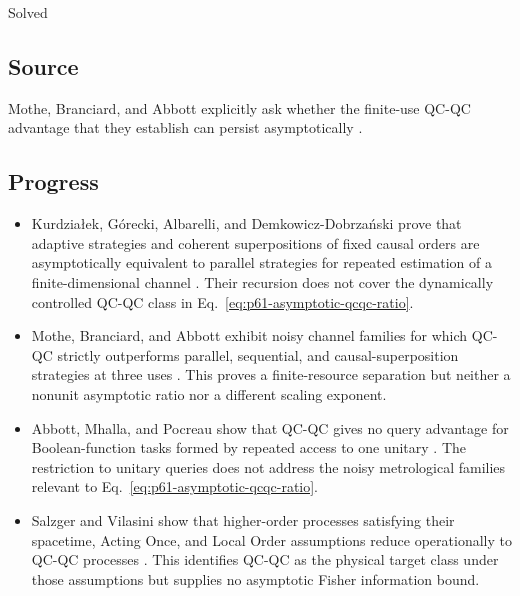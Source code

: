 Solved

\subsection*{Source}

Mothe, Branciard, and Abbott explicitly ask whether the finite-use QC-QC
advantage that they establish can persist asymptotically
.

\subsection*{Progress}

\begin{itemize}
  \item Kurdzia\l ek, G\'orecki, Albarelli, and Demkowicz-Dobrza\'nski prove
  that adaptive strategies and coherent superpositions of fixed causal
  orders are asymptotically equivalent to parallel strategies for repeated
  estimation of a finite-dimensional channel
  .  Their recursion does not cover
  the dynamically controlled QC-QC class in
  Eq.~\eqref{eq:p61-asymptotic-qcqc-ratio}.

  \item Mothe, Branciard, and Abbott exhibit noisy channel families for which
  QC-QC strictly outperforms parallel, sequential, and causal-superposition
  strategies at three uses .  This proves a
  finite-resource separation but neither a nonunit asymptotic ratio nor a
  different scaling exponent.

  \item Abbott, Mhalla, and Pocreau show that QC-QC gives no query advantage
  for Boolean-function tasks formed by repeated access to one unitary
  .  The restriction to unitary queries
  does not address the noisy metrological families relevant to
  Eq.~\eqref{eq:p61-asymptotic-qcqc-ratio}.

  \item Salzger and Vilasini show that higher-order processes satisfying
  their spacetime, Acting Once, and Local Order assumptions reduce
  operationally to QC-QC processes
  .  This identifies QC-QC as the physical
  target class under those assumptions but supplies no asymptotic Fisher
  information bound.


\end{itemize}
